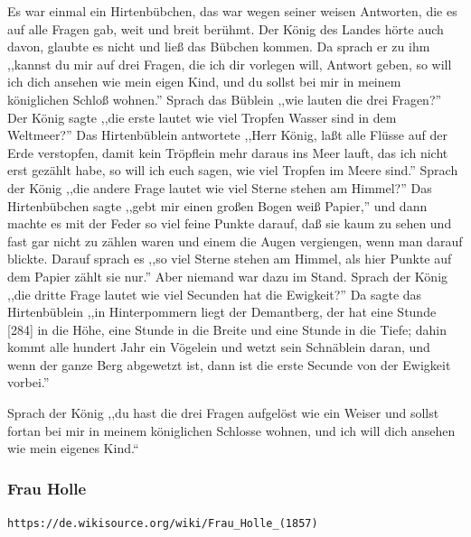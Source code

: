 \documentclass[10pt,a4paper]{article}
\begin{document}
\vskip 4pt
Es war einmal ein Hirtenbübchen, das war wegen seiner weisen Antworten, die es
auf alle Fragen gab, weit und breit berühmt. Der König des Landes hörte auch
davon, glaubte es nicht und ließ das Bübchen kommen. Da sprach er zu ihm
,,kannst du mir auf drei Fragen, die ich dir vorlegen will, Antwort geben, so
will ich dich ansehen wie mein eigen Kind, und du sollst bei mir in meinem
königlichen Schloß wohnen.'' Sprach das Büblein ,,wie lauten die drei Fragen?''
Der König sagte ,,die erste lautet wie viel Tropfen Wasser sind in dem
Weltmeer?'' Das Hirtenbüblein antwortete ,,Herr König, laßt alle Flüsse auf der
Erde verstopfen, damit kein Tröpflein mehr daraus ins Meer lauft, das ich nicht
erst gezählt habe, so will ich euch sagen, wie viel Tropfen im Meere sind.''
Sprach der König ,,die andere Frage lautet wie viel Sterne stehen am Himmel?''
Das Hirtenbübchen sagte ,,gebt mir einen großen Bogen weiß Papier,'' und dann
machte es mit der Feder so viel feine Punkte darauf, daß sie kaum zu sehen und
fast gar nicht zu zählen waren und einem die Augen vergiengen, wenn man darauf
blickte. Darauf sprach es ,,so viel Sterne stehen am Himmel, als hier Punkte auf
dem Papier zählt sie nur.'' Aber niemand war dazu im Stand. Sprach der König
,,die dritte Frage lautet wie viel Secunden hat die Ewigkeit?'' Da sagte das
Hirtenbüblein ,,in Hinterpommern liegt der Demantberg, der hat eine Stunde [284]
in die Höhe, eine Stunde in die Breite und eine Stunde in die Tiefe; dahin kommt
alle hundert Jahr ein Vögelein und wetzt sein Schnäblein daran, und wenn der
ganze Berg abgewetzt ist, dann ist die erste Secunde von der Ewigkeit vorbei.''

\vskip 4pt
Sprach der König ,,du hast die drei Fragen aufgelöst wie ein Weiser und sollst
fortan bei mir in meinem königlichen Schlosse wohnen, und ich will dich ansehen
wie mein eigenes Kind.“

\subsubsection{Frau Holle}

\verb+https://de.wikisource.org/wiki/Frau_Holle_(1857)+
\end{document}
